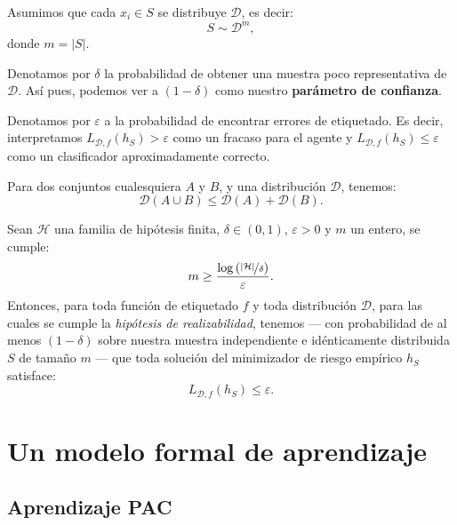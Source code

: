 \documentclass[8pt,a4paper]{extarticle}
\begin{document}
\begin{multicols}{3}
\begin{boxdef}
	Asumimos que cada $x_i \in S$ se distribuye  $\mathcal{D}$, es decir:
	\[
	S \sim \mathcal{D}^m
	,\] 
	donde $m = \left| S \right| $.
\end{boxdef}

\begin{boxrmk}
	Denotamos por $\delta$ la probabilidad de obtener una muestra poco representativa de  $\mathcal{D}$. Así pues, podemos ver a $(1 - \delta)$ como nuestro \textbf{parámetro de confianza}.
\end{boxrmk}

\begin{boxrmk}
	Denotamos por $\varepsilon$ a la probabilidad de encontrar errores de etiquetado. Es decir, interpretamos  $L_{\mathcal{D}, f} (h_S) > \varepsilon$ como un fracaso para el agente y $L_{\mathcal{D}, f} (h_S) \le \varepsilon$ como un clasificador aproximadamente correcto.
\end{boxrmk}

\begin{boxlemma}[]
	Para dos conjuntos cualesquiera $A$ y $B$, y una distribución $\mathcal{D}$, tenemos:
	\[
		\mathcal{D}\left( A \cup B \right) \le \mathcal{D}(A) + \mathcal{D}(B)
	.\] 
\end{boxlemma}

\begin{boxcor}[]
	Sean $\mathcal{H}$ una familia de hipótesis finita, $\delta \in (0,1)$,  $\varepsilon > 0$ y $m$ un entero, se cumple:
	 \[
		 m \ge \frac{\log \left( \nicefrac{\left| \mathcal{H} \right| }{\delta} \right)  }{\varepsilon}
	.\] 
	Entonces, para toda función de etiquetado $f$ y toda distribución  $\mathcal{D}$, para las cuales se cumple la \emph{hipótesis de realizabilidad}, tenemos --- con probabilidad de al menos $(1 - \delta)$ sobre nuestra muestra independiente e idénticamente distribuida $S$ de tamaño $m$ --- que toda solución del minimizador de riesgo empírico $h_S$ satisface:
	 \[
		 L_{\mathcal{D}, f} (h_S) \le \varepsilon
	.\] 
\end{boxcor}

\newpage

\section{Un modelo formal de aprendizaje}

\subsection{Aprendizaje PAC}


\end{multicols}
\end{document}
